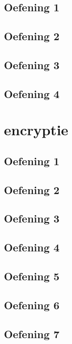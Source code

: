 \documentclass[a4paper,11pt]{report}
\begin{document}
\section{Oefening 1}

\section{Oefening 2}

\section{Oefening 3}

\section{Oefening 4}

\newpage

\chapter{encryptie}
\section{Oefening 1}

\section{Oefening 2}

\section{Oefening 3}

\section{Oefening 4}

\section{Oefening 5}

\section{Oefening 6}

\section{Oefening 7}

\end{document}
